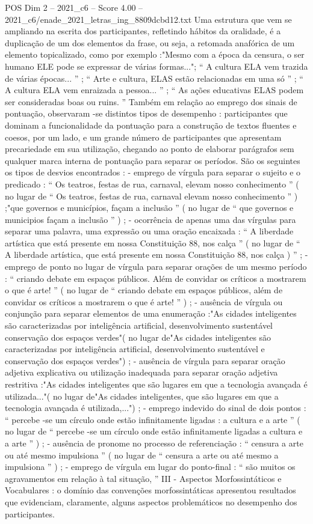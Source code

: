 \begin{textsample}{POS Dim 2 – 2021\_c6 – Score 4.00 – 2021\_c6/enade\_2021\_letras\_ing\_8809dcbd12.txt}
Uma estrutura que vem se ampliando na escrita dos participantes, refletindo hábitos da oralidade, é a duplicação de um dos elementos da frase, ou seja, a retomada anafórica de um elemento topicalizado, como por exemplo :"Mesmo com a época da censura, o ser humano ELE pode se expressar de várias formas..."; “ A cultura ELA vem trazida de várias épocas... ” ; “ Arte e cultura, ELAS estão relacionadas em uma só ” ; “ A cultura ELA vem enraizada a pessoa... ” ; “ As ações educativas ELAS podem ser consideradas boas ou ruins. ” Também em relação ao emprego dos sinais de pontuação, observaram -se distintos tipos de desempenho : participantes que dominam a funcionalidade da pontuação para a construção de textos fluentes e coesos, por um lado, e um grande número de participantes que apresentam precariedade em sua utilização, chegando ao ponto de elaborar parágrafos sem qualquer marca interna de pontuação para separar os períodos.
São os seguintes os tipos de desvios encontrados : - emprego de vírgula para separar o sujeito e o predicado : “ Os teatros, festas de rua, carnaval, elevam nosso conhecimento ” ( no lugar de “ Os teatros, festas de rua, carnaval elevam nosso conhecimento ” ) ;"que governos e municípios, façam a inclusão ” ( no lugar de “ que governos e municipios façam a inclusão ” ) ; - ocorrência de apenas uma das vírgulas para separar uma palavra, uma expressão ou uma oração encaixada : “ A liberdade artística que está presente em nossa Constituição 88, nos calça ” ( no lugar de “ A liberdade artística, que está presente em nossa Constituição 88, nos calça ) ” ; - emprego de ponto no lugar de vírgula para separar orações de um mesmo período : “ criando debate em espaços públicos.
Além de convidar os críticos a mostrarem o que é arte! ” ( no lugar de “ criando debate em espaços públicos, além de convidar os críticos a mostrarem o que é arte! ” ) ; - ausência de vírgula ou conjunção para separar elementos de uma enumeração :"As cidades inteligentes são caracterizadas por inteligência artificial, desenvolvimento sustentável conservação dos espaços verdes"( no lugar de"As cidades inteligentes são caracterizadas por inteligência artificial, desenvolvimento sustentável e conservação dos espaços verdes") ; - ausência de vírgula para separar oração adjetiva explicativa ou utilização inadequada para separar oração adjetiva restritiva :"As cidades inteligentes que são lugares em que a tecnologia avançada é utilizada..."( no lugar de"As cidades inteligentes, que são lugares em que a tecnologia avançada é utilizada,...") ; - emprego indevido do sinal de dois pontos : “ percebe -se um círculo onde estão infinitamente ligadas : a cultura e a arte ” ( no lugar de “ percebe -se um círculo onde estão infinitamente ligadas a cultura e a arte ” ) ; - ausência de pronome no processo de referenciação : “ censura a arte ou até mesmo impulsiona ” ( no lugar de “ censura a arte ou até mesmo a impulsiona ” ) ; - emprego de vírgula em lugar do ponto-final : “ são muitos os agravamentos em relação à tal situação, ” III - Aspectos Morfossintáticos e Vocabulares : o domínio das convenções morfossintáticas apresentou resultados que evidenciam, claramente, alguns aspectos problemáticos no desempenho dos participantes.

\end{textsample}
